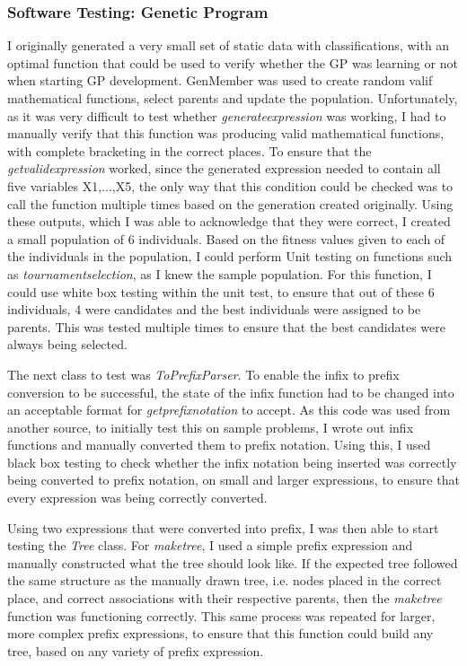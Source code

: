\documentclass[11pt]{article}
\begin{document}
\subsubsection{Software Testing: Genetic Program}
I originally generated a very small set of static data with classifications, with an optimal function that could be used to verify whether the GP was learning or not when starting GP development.
GenMember was used to create random valif mathematical functions, select parents and update the population. Unfortunately, as it was very difficult to test whether \textit{generate\textunderscore expression} was working, I had to manually verify that this function was producing valid mathematical functions, with complete bracketing in the correct places. To ensure that the \textit{get\textunderscore valid\textunderscore expression} worked, since the generated expression needed to contain all five variables X1,...,X5, the only way that this condition could be checked was to call the function multiple times based on the generation created originally. Using these outputs, which I was able to acknowledge that they were correct, I created a small population of 6 individuals. Based on the fitness values given to each of the individuals in the population, I could perform Unit testing on functions such as \textit{tournament\textunderscore selection}, as I knew the sample population. For this function, I could use white box testing within the unit test, to ensure that out of these 6 individuals, 4 were candidates and the best individuals were assigned to be parents. This was tested multiple times to ensure that the best candidates were always being selected. 
 
The next class to test was \textit{ToPrefixParser}. To enable the infix to prefix conversion to be successful, the state of the infix function had to be changed into an acceptable format for \textit{get\textunderscore prefix\textunderscore notation} to accept. As this code was used from another source, to initially test this on sample problems, I wrote out infix functions and manually converted them to prefix notation. Using this, I used black box testing to check whether the infix notation being inserted was correctly being converted to prefix notation, on small and larger expressions, to ensure that every expression was being correctly converted. 

Using two expressions that were converted into prefix, I was then able to start testing the \textit{Tree} class. For \textit{make\textunderscore tree}, I used a simple prefix expression
and manually constructed what the tree should look like. If the expected tree followed the same structure as the manually drawn tree, i.e. nodes placed in the correct place, and correct associations with their respective parents, then the \textit{make\textunderscore tree} function was functioning correctly.  This same process was repeated for larger, more complex prefix expressions, to ensure that this function could build any tree, based on any variety of prefix expression.  
\end{document}
